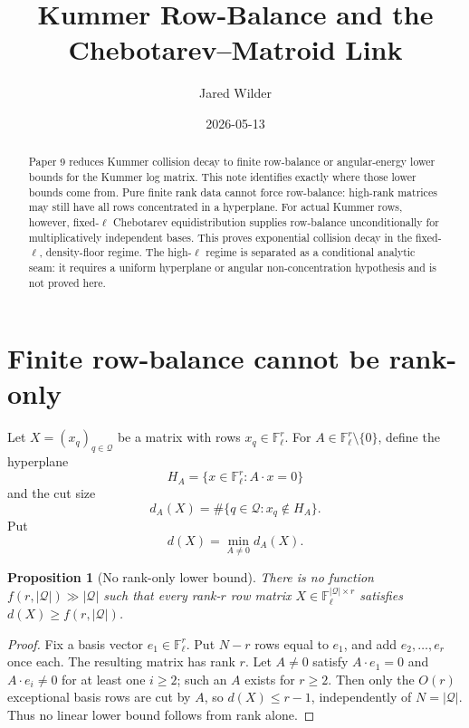 \documentclass[11pt]{article}
\title{Kummer Row-Balance and the Chebotarev--Matroid Link}
\author{Jared Wilder}
\date{2026-05-13}
\newtheorem{proposition}{Proposition}
\newcommand{\F}{\mathbb F}
\begin{document}
\maketitle

\begin{abstract}
Paper 9 reduces Kummer collision decay to finite row-balance or angular-energy lower bounds for the Kummer log matrix.  This note identifies exactly where those lower bounds come from.  Pure finite rank data cannot force row-balance: high-rank matrices may still have all rows concentrated in a hyperplane.  For actual Kummer rows, however, fixed-\(\ell\) Chebotarev equidistribution supplies row-balance unconditionally for multiplicatively independent bases.  This proves exponential collision decay in the fixed-\(\ell\), density-floor regime.  The high-\(\ell\) regime is separated as a conditional analytic seam: it requires a uniform hyperplane or angular non-concentration hypothesis and is not proved here.
\end{abstract}

\section{Finite row-balance cannot be rank-only}

Let \(X=(x_q)_{q\in\mathcal Q}\) be a matrix with rows \(x_q\in\F_\ell^r\).  For \(A\in\F_\ell^r\setminus\{0\}\), define the hyperplane
\[
H_A=\{x\in\F_\ell^r:A\cdot x=0\}
\]
and the cut size
\[
d_A(X)=\#\{q\in\mathcal Q:x_q\notin H_A\}.
\]
Put
\[
d(X)=\min_{A\ne0}d_A(X).
\]

\begin{proposition}[No rank-only lower bound]\label{P:no-rank-only}
There is no function \(f(r,|\mathcal Q|)\gg|\mathcal Q|\) such that every rank-\(r\) row matrix \(X\in\F_\ell^{|\mathcal Q|\times r}\) satisfies \(d(X)\ge f(r,|\mathcal Q|)\).
\end{proposition}

\begin{proof}
Fix a basis vector \(e_1\in\F_\ell^r\).  Put \(N-r\) rows equal to \(e_1\), and add \(e_2,\ldots,e_r\) once each.  The resulting matrix has rank \(r\).  Let \(A\ne0\) satisfy \(A\cdot e_1=0\) and \(A\cdot e_i\ne0\) for at least one \(i\ge2\); such an \(A\) exists for \(r\ge2\).  Then only the \(O(r)\) exceptional basis rows are cut by \(A\), so \(d(X)\le r-1\), independently of \(N=|\mathcal Q|\).  Thus no linear lower bound follows from rank alone.
\end{proof}
\end{document}

